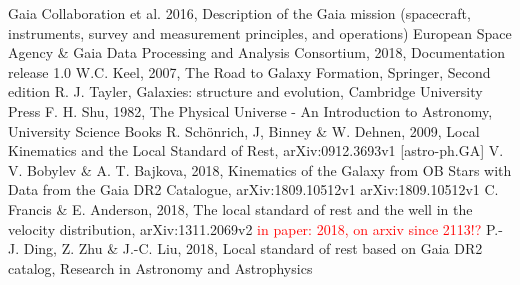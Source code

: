\documentclass{aastex62}
\begin{document}
	\begin{thebibliography}{}
		
		 Gaia Collaboration et al. 2016, Description of the Gaia mission (spacecraft, instruments, survey and measurement principles, and operations)
		 European Space Agency \& Gaia Data Processing and Analysis Consortium, 2018, Documentation release 1.0
		W.C. Keel, 2007, The Road to Galaxy Formation, Springer, Second edition
		 R. J. Tayler, Galaxies: structure and evolution, Cambridge University Press
		 F. H. Shu, 1982, The Physical Universe - An Introduction to Astronomy, University Science Books
		 R. Sch\"{o}nrich, J, Binney \& W. Dehnen, 2009, Local Kinematics and the Local Standard of Rest, arXiv:0912.3693v1 [astro-ph.GA]
		 V. V. Bobylev \& A. T. Bajkova, 2018, Kinematics of the Galaxy from OB Stars with Data from the Gaia DR2 Catalogue, arXiv:1809.10512v1 arXiv:1809.10512v1
		 C. Francis \& E. Anderson, 2018, The local standard of rest and the well in the velocity distribution, arXiv:1311.2069v2 \textcolor{red}{in paper: 2018, on arxiv since 2113!?}
		 P.-J. Ding, Z. Zhu \& J.-C. Liu, 2018, Local standard of rest based on Gaia DR2 catalog, Research in Astronomy and Astrophysics
		
	\end{thebibliography}
	
\end{document}
